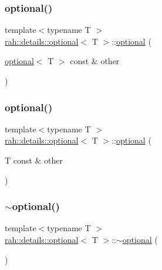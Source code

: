 \subsubsection{\texorpdfstring{optional()}{optional()}\hspace{0.1cm}{\footnotesize\ttfamily [2/3]}}
{\footnotesize\ttfamily template$<$typename T $>$ \\
\mbox{\hyperlink{structrah_1_1details_1_1optional}{rah\+::details\+::optional}}$<$ T $>$\+::\mbox{\hyperlink{structrah_1_1details_1_1optional}{optional}} (\begin{DoxyParamCaption}\item[{\mbox{\hyperlink{structrah_1_1details_1_1optional}{optional}}$<$ T $>$ const \&}]{other }\end{DoxyParamCaption})\hspace{0.3cm}{\ttfamily [inline]}}

\mbox{\label{structrah_1_1details_1_1optional_ab1f11335a6ba255db2f22a49ed34d984}} 
\subsubsection{\texorpdfstring{optional()}{optional()}\hspace{0.1cm}{\footnotesize\ttfamily [3/3]}}
{\footnotesize\ttfamily template$<$typename T $>$ \\
\mbox{\hyperlink{structrah_1_1details_1_1optional}{rah\+::details\+::optional}}$<$ T $>$\+::\mbox{\hyperlink{structrah_1_1details_1_1optional}{optional}} (\begin{DoxyParamCaption}\item[{T const \&}]{other }\end{DoxyParamCaption})\hspace{0.3cm}{\ttfamily [inline]}}

\mbox{\label{structrah_1_1details_1_1optional_acb7b6527ddc6fdf1d43aabc74dcfeb36}} 
\subsubsection{\texorpdfstring{$\sim$optional()}{~optional()}}
{\footnotesize\ttfamily template$<$typename T $>$ \\
\mbox{\hyperlink{structrah_1_1details_1_1optional}{rah\+::details\+::optional}}$<$ T $>$\+::$\sim$\mbox{\hyperlink{structrah_1_1details_1_1optional}{optional}} (\begin{DoxyParamCaption}{ }\end{DoxyParamCaption})\hspace{0.3cm}{\ttfamily [inline]}}




